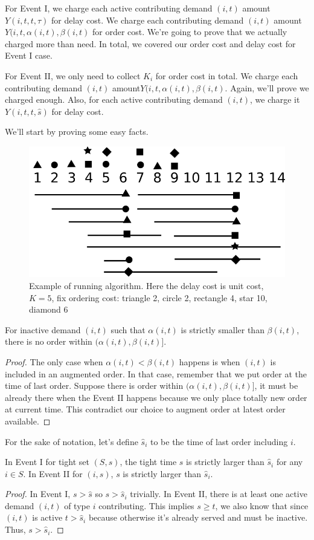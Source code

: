 For Event I, we charge each active contributing demand $(i,t)$ amount $Y(i,t,t,\tau)$ for delay cost. We charge each contributing demand $(i,t)$ amount $Y(i,t,\alpha(i,t),\beta(i,t)$ for order cost. We're going to prove that we actually charged more than need. In total, we covered our order cost and delay cost for Event I case.

For Event II, we only need to collect $K_i$ for order cost in total. We charge each contributing demand $(i,t)$ amount$Y(i,t,\alpha(i,t),\beta(i,t)$. Again, we'll prove we charged enough. Also, for each active contributing demand $(i,t)$, we charge it $Y(i,t,t,\hat s)$ for delay cost.

We'll start by proving some easy facts.

\begin{figure}
\centering
\includegraphics[width=.7\linewidth]{other/jrp}
\caption{Example of running algorithm. Here the delay cost is unit cost, $K = 5$, fix ordering cost: triangle 2, circle 2, rectangle 4, star 10, diamond 6}
\end{figure}

\begin{lemma}
For inactive demand $(i,t)$ such that $\alpha(i,t)$ is strictly smaller than $\beta(i,t)$, there is no order within $(\alpha(i,t), \beta(i,t)]$. \label{lem:overlap}
\end{lemma}
\begin{proof}
The only case when $\alpha(i,t) < \beta(i,t)$ happens is when $(i,t)$ is included in an augmented order. In that case, remember that we put order at the time of last order. Suppose there is order within $(\alpha(i,t), \beta(i,t)]$, it must be already there when the Event II happens because we only place totally new order at current time. This contradict our choice to augment order at latest order available.
\end{proof}

For the sake of notation, let's define $\hat s_i$ to be the time of last order including $i$.

\begin{lemma}
In Event I for tight set $(S,s)$, the tight time $s$ is strictly larger than $\hat s_i$ for any $i\in S$. In Event II for $(i,s)$, $s$ is strictly larger than $\hat s_i$. \label{lem:larger}
\end{lemma}
\begin{proof}
In Event I, $s > \hat s$ so $s > \hat s_i$ trivially. In Event II, there is at least one active demand $(i,t)$ of type $i$ contributing. This implies $s \ge t$, we also know that since $(i,t)$ is active $t > \hat s_i$ because otherwise it's already served and must be inactive. Thus, $s > \hat s_i$.
\end{proof}

